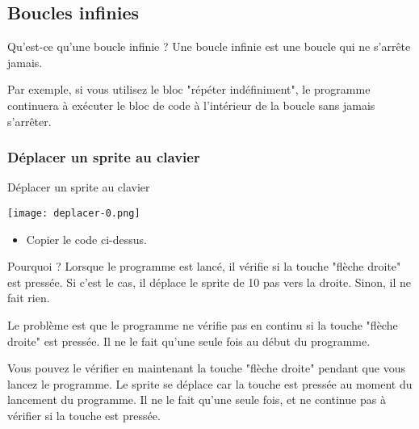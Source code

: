 \subsection{Boucles infinies}
\begin{UPSTIinfor}{Qu'est-ce qu'une boucle infinie ?}
Une boucle infinie est une boucle qui ne s'arrête jamais.

Par exemple, si vous utilisez le bloc "répéter indéfiniment", le programme continuera à exécuter le bloc de code à l'intérieur de la boucle sans jamais s'arrêter.
\end{UPSTIinfor}

\subsubsection{Déplacer un sprite au clavier}

\begin{UPSTIManipulation}{Déplacer un sprite au clavier}
    \begin{center}
        \texttt{[image: deplacer-0.png]}
    \end{center}
\begin{itemize}[label=$\square$]
    \item Copier le code ci-dessus.
\end{itemize}
\end{UPSTIManipulation}


\begin{UPSTIidee}{{Pourquoi ?}}
Lorsque le programme est lancé, il vérifie si la touche "flèche droite" est pressée. Si c'est le cas, il déplace le sprite de 10 pas vers la droite. Sinon, il ne fait rien.

Le problème est que le programme ne vérifie pas en continu si la touche "flèche droite" est pressée. Il ne le fait qu'une seule fois au début du programme.

Vous pouvez le vérifier en maintenant la touche "flèche droite" pendant que vous lancez le programme. Le sprite se déplace car la touche est pressée au moment du lancement du programme. Il ne le fait qu'une seule fois, et ne continue pas à vérifier si la touche est pressée.
\end{UPSTIidee}

